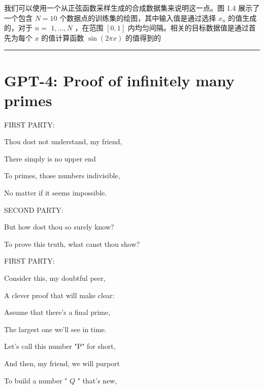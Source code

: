 \documentclass[10pt]{article}
\newcommand{\HRule}{\begin{center}\rule{0.9\linewidth}{0.2mm}\end{center}}
\begin{document}
我们可以使用一个从正弦函数采样生成的合成数据集来说明这一点。图 1.4 展示了一个包含 \(N = {10}\) 个数据点的训练集的绘图，其中输入值是通过选择 \({x}_{n}\) 的值生成的，对于 \(n =\)  \(1,\ldots ,N\) ，在范围 \(\left\lbrack  {0,1}\right\rbrack\) 内均匀间隔。相关的目标数据值是通过首先为每个 \(x\) 的值计算函数 \(\sin \left( {2\pi x}\right)\) 的值得到的

\HRule

\section*{GPT-4: Proof of infinitely many primes}

\hspace*{1em} FIRST PARTY:

\hspace*{1em} Thou dost not understand, my friend,

\hspace*{1em} There simply is no upper end

\hspace*{1em} To primes, those numbers indivisible,

\hspace*{1em} No matter if it seems impossible.

\hspace*{1em} SECOND PARTY:

\hspace*{1em} But how dost thou so surely know?

\hspace*{1em} To prove this truth, what canst thou show?

\hspace*{1em} FIRST PARTY:

\hspace*{1em} Consider this, my doubtful peer,

\hspace*{1em} A clever proof that will make clear:

\hspace*{1em} Assume that there's a final prime,

\hspace*{1em} The largest one we'll see in time.

\hspace*{1em} Let's call this number "P" for short,

\hspace*{1em} And then, my friend, we will purport

\hspace*{1em} To build a number " \(Q\) " that's new,
\end{document}
